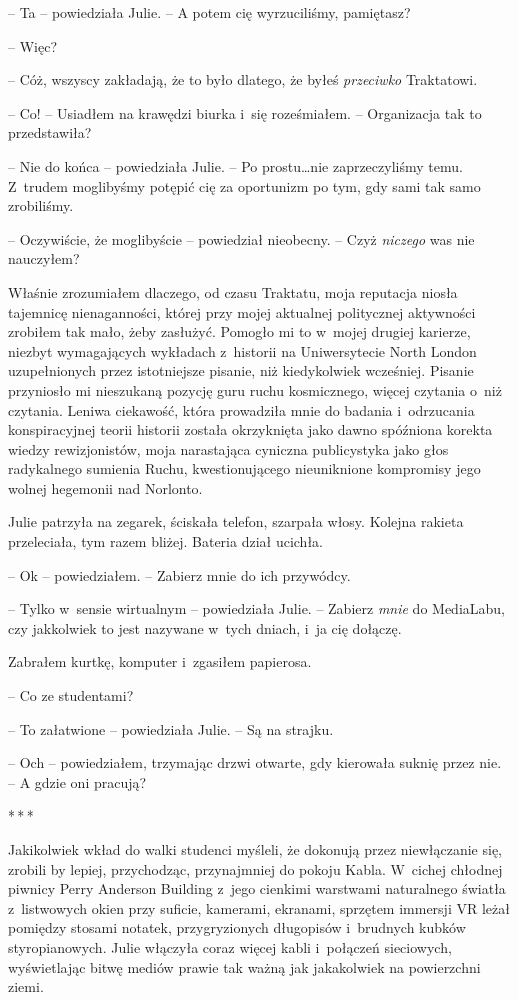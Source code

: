 \documentclass[oneside,polish,11pt,sfheadings]{mwbk}
\newcommand{\threeast}{\bigskip\par\centerline{*\,*\,*}\medskip\par}
\begin{document}
-- Ta -- powiedziała Julie. -- A potem cię wyrzuciliśmy, pamiętasz?

-- Więc?

-- Cóż, wszyscy zakładają, że to było dlatego, że byłeś \emph{przeciwko}
Traktatowi.

-- Co! -- Usiadłem na krawędzi biurka i~się roześmiałem. -- Organizacja tak
to przedstawiła?

-- Nie do końca -- powiedziała Julie. -- Po prostu\ldots nie zaprzeczyliśmy
temu. Z~trudem moglibyśmy potępić cię za oportunizm po tym, gdy sami tak
samo zrobiliśmy.

-- Oczywiście, że moglibyście -- powiedział nieobecny. -- Czyż
\emph{niczego} was nie nauczyłem?

Właśnie zrozumiałem dlaczego, od czasu Traktatu, moja reputacja niosła
tajemnicę nienaganności, której przy mojej aktualnej politycznej
aktywności zrobiłem tak mało, żeby zasłużyć. Pomogło mi to w~mojej
drugiej karierze, niezbyt wymagających wykładach z~historii na
Uniwersytecie North London uzupełnionych przez istotniejsze pisanie, niż
kiedykolwiek wcześniej. Pisanie przyniosło mi nieszukaną pozycję guru
ruchu kosmicznego, więcej czytania o~niż czytania. Leniwa ciekawość,
która prowadziła mnie do badania i~odrzucania konspiracyjnej teorii
historii została okrzyknięta jako dawno spóźniona korekta wiedzy
rewizjonistów, moja narastająca cyniczna publicystyka jako głos
radykalnego sumienia Ruchu, kwestionującego nieuniknione kompromisy jego
wolnej hegemonii nad Norlonto.

Julie patrzyła na zegarek, ściskała telefon, szarpała włosy. Kolejna
rakieta przeleciała, tym razem bliżej. Bateria dział ucichła.

-- Ok -- powiedziałem. -- Zabierz mnie do ich przywódcy.

-- Tylko w~sensie wirtualnym -- powiedziała Julie. -- Zabierz \emph{mnie}
do MediaLabu, czy jakkolwiek to jest nazywane w~tych dniach, i~ja cię
dołączę.

Zabrałem kurtkę, komputer i~zgasiłem papierosa. 

-- Co ze studentami?

-- To załatwione -- powiedziała Julie. -- Są na strajku.

-- Och -- powiedziałem, trzymając drzwi otwarte, gdy kierowała suknię
przez nie. -- A gdzie oni pracują?

\threeast

Jakikolwiek wkład do walki studenci myśleli, że dokonują przez
niewłączanie się, zrobili by lepiej, przychodząc, przynajmniej do pokoju
Kabla. W~cichej chłodnej piwnicy Perry Anderson Building z~jego cienkimi
warstwami naturalnego światła z~listwowych okien przy suficie, kamerami,
ekranami, sprzętem immersji VR leżał pomiędzy stosami notatek,
przygryzionych długopisów i~brudnych kubków styropianowych. Julie
włączyła coraz więcej kabli i~połączeń sieciowych, wyświetlając bitwę
mediów prawie tak ważną jak jakakolwiek na powierzchni ziemi.
\end{document}

